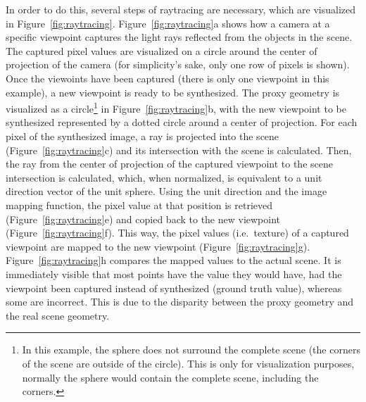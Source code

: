In order to do this, several steps of raytracing are necessary, which are visualized in Figure~\ref{fig:raytracing}. Figure~\ref{fig:raytracing}a shows how a camera at a specific viewpoint captures the light rays reflected from the objects in the scene. The captured pixel values are visualized on a circle around the center of projection of the camera (for simplicity's sake, only one row of pixels is shown). Once the viewoints have been captured (there is only one viewpoint in this example), a new viewpoint is ready to be synthesized. The proxy geometry is visualized as a circle\footnote{In this example, the sphere does not surround the complete scene (the corners of the scene are outside of the circle). This is only for visualization purposes, normally the sphere would contain the complete scene, including the corners.} in Figure~\ref{fig:raytracing}b, with the new viewpoint to be synthesized represented by a dotted circle around a center of projection. For each pixel of the synthesized image, a ray is projected into the scene (Figure~\ref{fig:raytracing}c) and its intersection with the scene is calculated. Then, the ray from the center of projection of the captured viewpoint to the scene intersection is calculated, which, when normalized, is equivalent to a unit direction vector of the unit sphere. Using the unit direction and the image mapping function, the pixel value at that position is retrieved (Figure~\ref{fig:raytracing}e) and copied back to the new viewpoint (Figure~\ref{fig:raytracing}f). This way, the pixel values (i.e.\ texture) of a captured viewpoint are mapped to the new viewpoint (Figure~\ref{fig:raytracing}g). Figure~\ref{fig:raytracing}h compares the mapped values to the actual scene. It is immediately visible that most points have the value they would have, had the viewpoint been captured instead of synthesized (ground truth value), whereas some are incorrect. This is due to the disparity between the proxy geometry and the real scene geometry.

